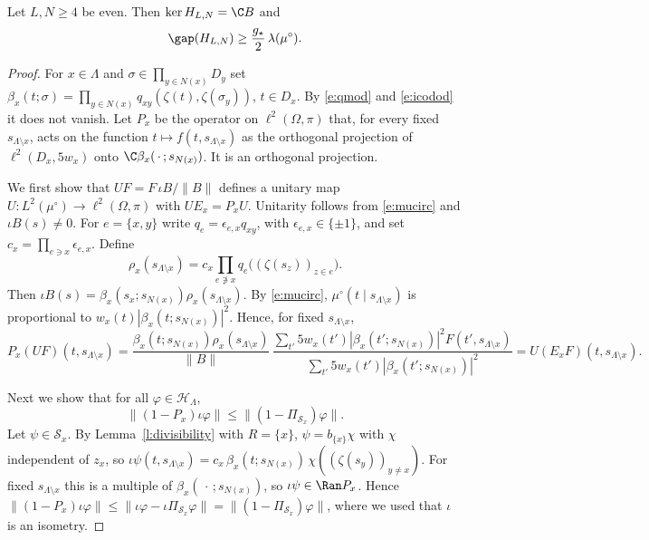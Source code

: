 \begin{theorem}\label{t:QD}
Let $L, N \ge 4$ be even. Then $\ker H_{L, N} = \C B$ and
\begin{equation*}
\gap(H_{L, N}) \ge \frac{g_\star}{2} \, \lambda(\mu^\circ) .
\end{equation*}
\end{theorem}

\begin{proof}
For $x \in \Lambda$ and $\sigma \in \prod_{y \in N(x)} D_y$ set $\beta_x(t; \sigma) = \prod_{y \in N(x)} q_{xy}(\zeta(t), \zeta(\sigma_y))$, $t \in D_x$. By \eqref{e:qmod} and \eqref{e:icodod} it does not vanish. Let $P_x$ be the operator on $\ell^2(\Omega, \pi)$ that, for every fixed $s_{\Lambda \setminus x}$, acts on the function $t \mapsto f(t, s_{\Lambda \setminus x})$ as the orthogonal projection of $\ell^2(D_x, 5 w_x)$ onto $\C \beta_x(\, \cdot \,; s_{N(x)})$. It is an orthogonal projection.

We first show that $U F = F \, \iota B / \|B\|$ defines a unitary map $U \colon L^2(\mu^\circ) \to \ell^2(\Omega, \pi)$ with $U E_x = P_x U$. Unitarity follows from \eqref{e:mucirc} and $\iota B(s) \neq 0$. For $e=\{x,y\}$ write $q_e=\epsilon_{e,x}q_{xy}$, with $\epsilon_{e,x}\in\{\pm1\}$, and set $c_x=\prod_{e\ni x}\epsilon_{e,x}$. Define
\begin{equation*}
\rho_x(s_{\Lambda\setminus x})
=c_x\prod_{e\not\ni x}q_e\bigl((\zeta(s_z))_{z\in e}\bigr).
\end{equation*}
Then $\iota B(s)=\beta_x(s_x;s_{N(x)})\rho_x(s_{\Lambda\setminus x})$. By \eqref{e:mucirc}, $\mu^\circ(t \mid s_{\Lambda \setminus x})$ is proportional to $w_x(t) |\beta_x(t; s_{N(x)})|^2$. Hence, for fixed $s_{\Lambda \setminus x}$,
\begin{equation*}
P_x (U F)(t, s_{\Lambda \setminus x}) = \frac{\beta_x(t; s_{N(x)}) \rho_x(s_{\Lambda \setminus x})}{\|B\|} \, \frac{\sum_{t'} 5 w_x(t') |\beta_x(t'; s_{N(x)})|^2 F(t', s_{\Lambda \setminus x})}{\sum_{t'} 5 w_x(t') |\beta_x(t'; s_{N(x)})|^2} = U(E_x F)(t, s_{\Lambda \setminus x}).
\end{equation*}

Next we show that for all $\varphi \in \mathcal H_\Lambda$,
\begin{equation}\label{e:QDcomp}
\|(1 - P_x) \iota \varphi\| \le \|(1 - \Pi_{\mathcal S_x}) \varphi\| .
\end{equation}
Let $\psi \in \mathcal S_x$. By Lemma~\ref{l:divisibility} with $R = \{x\}$, $\psi = b_{\{x\}} \chi$ with $\chi$ independent of $z_x$, so $\iota \psi(t, s_{\Lambda \setminus x}) = c_x\,\beta_x(t; s_{N(x)}) \, \chi((\zeta(s_y))_{y \neq x})$. For fixed $s_{\Lambda \setminus x}$ this is a multiple of $\beta_x(\, \cdot \,; s_{N(x)})$, so $\iota \psi \in \Ran P_x$. Hence $\|(1 - P_x) \iota \varphi\| \le \|\iota \varphi - \iota \Pi_{\mathcal S_x} \varphi\| = \|(1 - \Pi_{\mathcal S_x}) \varphi\|$, where we used that $\iota$ is an isometry.


\end{proof}
